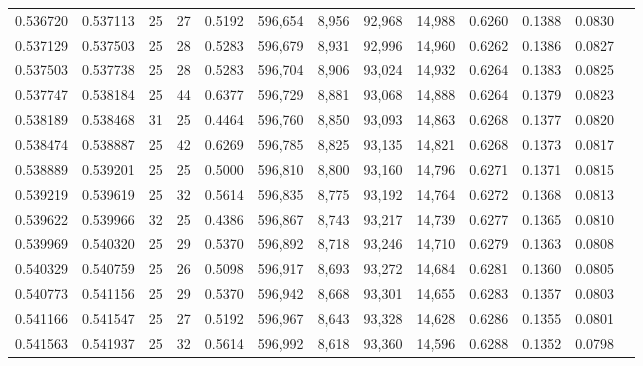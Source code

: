 \begin{tabular}{rrrrrrrrrrrrr}
0.536720 & 0.537113 &    25 &  27 &                                     0.5192 & 596,654 &   8,956 &  92,968 &  14,988 & 0.6260 & 0.1388 & 0.0830 \\
0.537129 & 0.537503 &    25 &  28 &                                     0.5283 & 596,679 &   8,931 &  92,996 &  14,960 & 0.6262 & 0.1386 & 0.0827 \\
0.537503 & 0.537738 &    25 &  28 &                                     0.5283 & 596,704 &   8,906 &  93,024 &  14,932 & 0.6264 & 0.1383 & 0.0825 \\
0.537747 & 0.538184 &    25 &  44 &                                     0.6377 & 596,729 &   8,881 &  93,068 &  14,888 & 0.6264 & 0.1379 & 0.0823 \\
0.538189 & 0.538468 &    31 &  25 &                                     0.4464 & 596,760 &   8,850 &  93,093 &  14,863 & 0.6268 & 0.1377 & 0.0820 \\
0.538474 & 0.538887 &    25 &  42 &                                     0.6269 & 596,785 &   8,825 &  93,135 &  14,821 & 0.6268 & 0.1373 & 0.0817 \\
0.538889 & 0.539201 &    25 &  25 &                                     0.5000 & 596,810 &   8,800 &  93,160 &  14,796 & 0.6271 & 0.1371 & 0.0815 \\
0.539219 & 0.539619 &    25 &  32 &                                     0.5614 & 596,835 &   8,775 &  93,192 &  14,764 & 0.6272 & 0.1368 & 0.0813 \\
0.539622 & 0.539966 &    32 &  25 &                                     0.4386 & 596,867 &   8,743 &  93,217 &  14,739 & 0.6277 & 0.1365 & 0.0810 \\
0.539969 & 0.540320 &    25 &  29 &                                     0.5370 & 596,892 &   8,718 &  93,246 &  14,710 & 0.6279 & 0.1363 & 0.0808 \\
0.540329 & 0.540759 &    25 &  26 &                                     0.5098 & 596,917 &   8,693 &  93,272 &  14,684 & 0.6281 & 0.1360 & 0.0805 \\
0.540773 & 0.541156 &    25 &  29 &                                     0.5370 & 596,942 &   8,668 &  93,301 &  14,655 & 0.6283 & 0.1357 & 0.0803 \\
0.541166 & 0.541547 &    25 &  27 &                                     0.5192 & 596,967 &   8,643 &  93,328 &  14,628 & 0.6286 & 0.1355 & 0.0801 \\
0.541563 & 0.541937 &    25 &  32 &                                     0.5614 & 596,992 &   8,618 &  93,360 &  14,596 & 0.6288 & 0.1352 & 0.0798 \\

\end{tabular}
